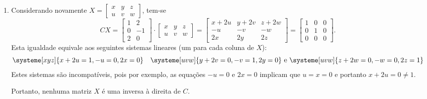 \documentclass[12pt,a4paper]{article}
\begin{document}
\begin{enumerate}
\begin{enumerate}
\item Considerando novamente $X = 
\begin{bmatrix}
x & y & z\\
u & v & w
\end{bmatrix}$, tem-se
\[
CX = 
\begin{bmatrix}
1 & 2\\
0 & -1\\
2 & 0
\end{bmatrix}
\cdot
\begin{bmatrix}
x & y & z\\
u & v & w
\end{bmatrix}
=
\begin{bmatrix}
x+2u & y+2v & z+2w\\
  -u &   -v &   -w\\
  2x &   2y &   2z
\end{bmatrix}
=
\begin{bmatrix}
1 & 0 & 0 \\
0 & 1 & 0 \\
0 & 0 & 0
\end{bmatrix}.
\]
Esta igualdade equivale aos seguintes sistemas lineares (um para cada coluna de $X$):
\[
\systeme[xyz]{
x + 2u = 1,
    -u = 0,
    2x = 0
}
\quad
\systeme[uvw]{
y + 2v = 0,
    -v = 1,
    2y = 0
}
\text{ e }
\systeme[uvw]{
z + 2w = 0,
    -w = 0,
    2z = 1
}
\]
Estes sistemas são incompatíveis, pois por exemplo, as equações $-u = 0$ e $2x = 0$ implicam que $u=x=0$ e portanto $x+2u = 0 \neq 1$.

Portanto, nenhuma matriz $X$ é uma inversa à direita de $C$.
\end{enumerate}

\end{enumerate}
\end{document}
